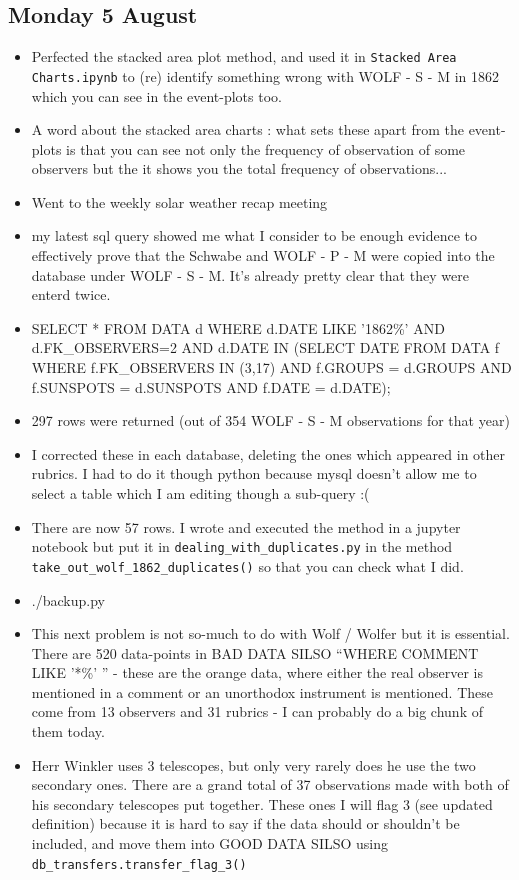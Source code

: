 \documentclass[12pt]{article}
\begin{document}
\subsection{Monday 5 August}
\begin{itemize}
    \item Perfected the stacked area plot method, and used it in \texttt{Stacked Area Charts.ipynb} to (re) identify something wrong with WOLF - S - M in 1862 which you can see in the event-plots too.
    \item A word about the stacked area charts : what sets these apart from the event-plots is that you can see not only the frequency of observation of some observers but the it shows you the total frequency of observations...
    \item Went to the weekly solar weather recap meeting
    \item my latest sql query showed me what I consider to be enough evidence to effectively prove that the Schwabe and WOLF - P - M were copied into the database under WOLF - S - M. It's already pretty clear that they were enterd twice. 
    \item SELECT * FROM DATA d WHERE d.DATE LIKE '1862\%' AND d.FK\_OBSERVERS=2 AND d.DATE IN (SELECT DATE FROM DATA f WHERE f.FK\_OBSERVERS IN (3,17) AND f.GROUPS = d.GROUPS AND f.SUNSPOTS = d.SUNSPOTS AND f.DATE = d.DATE);
    \item 297 rows were returned (out of 354 WOLF - S - M observations for that year)
    \item I corrected these in each database, deleting the ones which appeared in other rubrics. I had to do it though python because mysql doesn't allow me to select a table which I am editing though a sub-query :(
    \item There are now 57 rows. I wrote and executed the method in a jupyter notebook but put it in \texttt{dealing\_with\_duplicates.py} in the method \texttt{take\_out\_wolf\_1862\_duplicates()} so that you can check what I did.
    \item ./backup.py
    \item This next problem is not so-much to do with Wolf / Wolfer but it is essential. There are 520 data-points in BAD DATA SILSO ``WHERE COMMENT LIKE '*\%' '' - these are the orange data, where either the real observer is mentioned in a comment or an unorthodox instrument is mentioned. These come from 13 observers and 31 rubrics - I can probably do a big chunk of them today.
    \item Herr Winkler uses 3 telescopes, but only very rarely does he use the two secondary ones. There are a grand total of 37 observations made with both of his secondary telescopes put together. These ones I will flag 3 (see updated definition) because it is hard to say if the data should or shouldn't be included, and move them into GOOD DATA SILSO using \texttt{db\_transfers.transfer\_flag\_3()}

\end{itemize}
\end{document}
